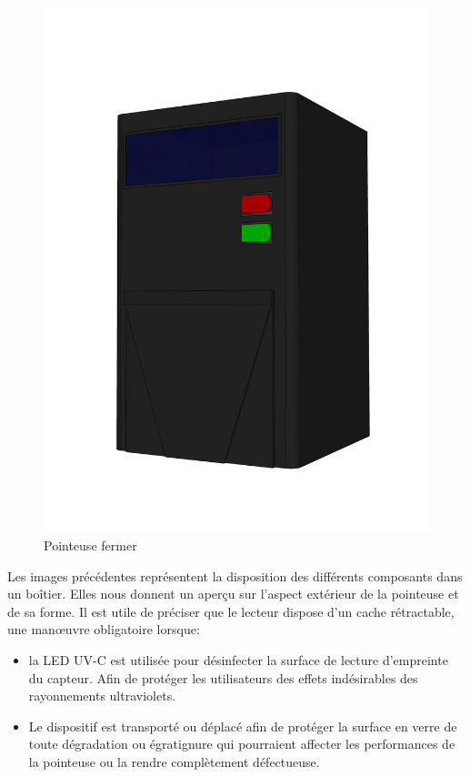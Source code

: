 \begin{figure}[!htb]
\begin{minipage}{0.5\textwidth}
        \includegraphics[scale=0.16]{images/prototype/4.png}
        \vspace{-40pt}
        \caption{Pointeuse fermer}\label{ }
    \end{minipage}
\end{figure}

Les images précédentes représentent la disposition des différents composants 
dans un boîtier. Elles nous donnent un aperçu sur l’aspect extérieur de la 
pointeuse et de sa forme. Il est utile de préciser que le lecteur dispose d’un 
cache rétractable, une manœuvre obligatoire lorsque:

\begin{itemize}
    \item [\textbullet] la LED UV-C est utilisée pour désinfecter la surface de
        lecture d’empreinte du capteur. Afin de protéger les utilisateurs des
        effets indésirables des rayonnements ultraviolets.
    \item [\textbullet]  Le dispositif est transporté ou déplacé afin de
        protéger la surface en verre de toute dégradation ou égratignure qui
        pourraient affecter les performances de la pointeuse ou la rendre
        complètement défectueuse.  
\end{itemize}

